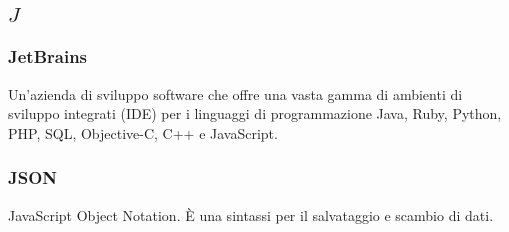 \subsection*{\quad$J\quad$}
\subsubsection*{JetBrains}
Un'azienda di sviluppo software che offre una vasta gamma di ambienti di sviluppo integrati (IDE) per i linguaggi di programmazione Java, Ruby, Python, PHP, SQL, Objective-C, C++ e JavaScript.

\subsubsection*{JSON}
JavaScript Object Notation. È una sintassi per il salvataggio e scambio di dati. 

